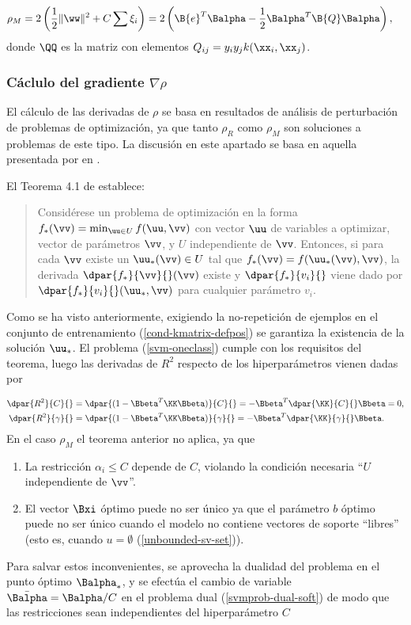 \begin{align}
\label{prieqdual}
  \rho_M &= 2\left(\frac{1}{2}\|\ww\|^2+C\sum\xi_i \right)
  =2\left(\B{e}^T\Balpha-\frac{1}{2}\Balpha^T\B{Q}\Balpha\right),
\end{align}
donde $\QQ$ es la matriz con elementos $Q_{ij}=y_iy_jk(\xx_i,\xx_j)$.

\subsubsection{Cáclulo del gradiente $\nabla\rho$}
El cálculo de las derivadas de $\rho$ se basa en resultados de
análisis de perturbación de problemas de optimización, ya que tanto
$\rho_R$ como $\rho_M$ son soluciones a problemas de este tipo.  La
discusión en este apartado se basa en aquella presentada por
\citeauthor{chung} en \cite{chung}.

El Teorema 4.1 de \cite{bonnans-shapiro} establece:

\begin{quote}
  Considérese un problema de optimización en la forma
  $f_*(\vv)=\min_{\uu\in{}U}f(\uu,\vv)$ con vector $\uu$ de variables a
  optimizar, vector de parámetros $\vv$, y $U$ independiente de
  $\vv$. Entonces, si para cada $\vv$ existe un $\uu_*(\vv)\in{}U$
  tal que $f_*(\vv)=f(\uu_*(\vv),\vv)$, la derivada
  $\dpar{f_*}{\vv}{}(\vv)$ existe y $\dpar{f_*}{v_i}{}$ viene dado por
  $\dpar{f_*}{v_i}{}(\uu_*,\vv)$ para cualquier parámetro $v_i$.
\end{quote}

Como se ha visto anteriormente, exigiendo la no-repetición de ejemplos
en el conjunto de entrenamiento (\ref{cond-kmatrix-defpos}) se
garantiza la existencia de la solución $\uu_*$.
El problema (\ref{svm-oneclass}) cumple con los requisitos del teorema,
luego las derivadas de $R^2$ respecto de los hiperparámetros vienen
dadas por

\begin{align}
  \dpar{R^2}{C}{} &= \dpar{(1-\Bbeta^T\KK\Bbeta)}{C}{}
  = -\Bbeta^T \dpar{\KK}{C}{}\Bbeta = 0, \\
  \dpar{R^2}{\gamma}{} &= \dpar{(1-\Bbeta^T\KK\Bbeta)}{\gamma}{}
  = -\Bbeta^T \dpar{\KK}{\gamma}{}\Bbeta.
\end{align}
En el caso $\rho_M$ el teorema anterior no aplica, ya que

\begin{enumerate}
\item La restricción $\alpha_i\leq{}C$ depende de $C$, violando la condición
  necesaria ``$U$ independiente de $\vv$''.
\item El vector $\Bxi$ óptimo puede no ser único ya que el parámetro $b$ óptimo
  puede no ser único cuando el modelo no contiene vectores de soporte
  ``libres'' (esto es, cuando $u=\emptyset$ (\ref{unbounded-sv-set})).
\end{enumerate}
Para salvar estos inconvenientes, se aprovecha la dualidad del
problema en el punto óptimo $\Balpha_*$, y se efectúa el cambio de
variable $\bar{\Balpha}=\Balpha/C$ en el problema dual
(\ref{svmprob-dual-soft}) de modo que las restricciones sean
independientes del hiperparámetro $C$

